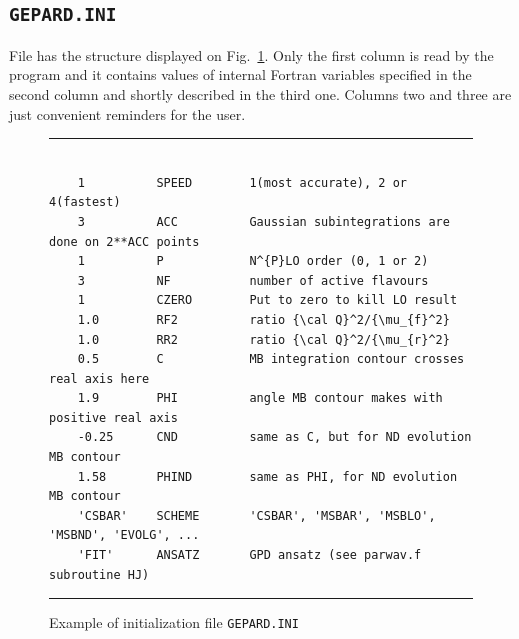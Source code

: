 \documentclass[12pt]{article}
\begin{document}
\subsection{\texttt{GEPARD.INI}}
\label{ssect:GEPARD.INI}

File has the structure displayed on Fig.~\ref{fig:GEPARD.INI}.
Only the first column is read by the program and it contains
values of internal Fortran variables specified in the second column and
shortly described in the third one. 
Columns two and three are just convenient reminders for the user. 

\begin{figure}[t]
\begin{center}
\hrule
\begin{verbatim}

    1          SPEED        1(most accurate), 2 or 4(fastest)
    3          ACC          Gaussian subintegrations are done on 2**ACC points 
    1          P            N^{P}LO order (0, 1 or 2)
    3          NF           number of active flavours
    1          CZERO        Put to zero to kill LO result
    1.0        RF2          ratio {\cal Q}^2/{\mu_{f}^2}
    1.0        RR2          ratio {\cal Q}^2/{\mu_{r}^2}
    0.5        C            MB integration contour crosses real axis here
    1.9        PHI          angle MB contour makes with positive real axis
    -0.25      CND          same as C, but for ND evolution MB contour
    1.58       PHIND        same as PHI, for ND evolution MB contour
    'CSBAR'    SCHEME       'CSBAR', 'MSBAR', 'MSBLO', 'MSBND', 'EVOLG', ...
    'FIT'      ANSATZ       GPD ansatz (see parwav.f subroutine HJ)

\end{verbatim}
\hrule
\end{center}
\caption{Example of initialization file \texttt{GEPARD.INI}}
\label{fig:GEPARD.INI}
\end{figure}
\end{document}
